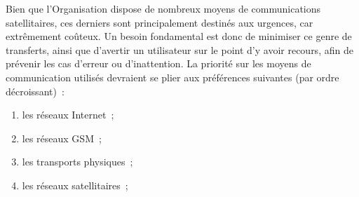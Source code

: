 \begin{constraint}
Bien que l'Organisation dispose de nombreux moyens de communications satellitaires, ces derniers sont principalement destinés aux urgences, car extrêmement coûteux. Un besoin fondamental est donc de minimiser ce genre de transferts, ainsi que d'avertir un utilisateur sur le point d'y avoir recours, afin de prévenir les cas d'erreur ou d'inattention.
La priorité sur les moyens de communication utilisés devraient se plier aux préférences suivantes (par ordre décroissant)~:
\begin{enumerate}
	\item les réseaux Internet~;
	\item les réseaux GSM~;
	\item les transports physiques~;
	\item les réseaux satellitaires~;
\end{enumerate}
\end{constraint}





